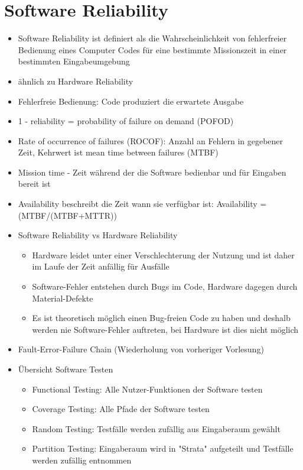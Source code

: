 \documentclass[paper=a4, fontsize=11pt]{scrartcl} %
\numberwithin{equation}{section} %
\numberwithin{figure}{section} %
\numberwithin{table}{section} %
\begin{document}
\section{Software Reliability}

\begin{itemize}
  \item Software Reliability ist definiert als die Wahrscheinlichkeit von fehlerfreier Bedienung eines Computer Codes für eine bestimmte Missionszeit in einer bestimmten Eingabeumgebung
  \item ähnlich zu Hardware Reliability
  \item Fehlerfreie Bedienung: Code produziert die erwartete Ausgabe
  \item 1 - reliability = probability of failure on demand (POFOD)
  \item Rate of occurrence of failures (ROCOF): Anzahl an Fehlern in gegebener Zeit, Kehrwert ist mean time between failures (MTBF)
  \item Mission time - Zeit während der die Software bedienbar und für Eingaben bereit ist
  \item Availability beschreibt die Zeit wann sie verfügbar ist: Availability = (MTBF/(MTBF+MTTR))
  \item Software Reliability vs Hardware Reliability
  \begin{itemize}
    \item Hardware leidet unter einer Verschlechterung der Nutzung und ist daher im Laufe der Zeit anfällig für Ausfälle
    \item Software-Fehler entstehen durch Bugs im Code, Hardware dagegen durch Material-Defekte
    \item Es ist theoretisch möglich einen Bug-freien Code zu haben und deshalb werden nie Software-Fehler auftreten, bei Hardware ist dies nicht möglich
  \end{itemize}
  \item Fault-Error-Failure Chain (Wiederholung von vorheriger Vorlesung)
  \item Übersicht Software Testen
  \begin{itemize}
    \item Functional Testing: Alle Nutzer-Funktionen der Software testen
    \item Coverage Testing: Alle Pfade der Software testen
    \item Random Testing: Testfälle werden zufällig aus Eingaberaum gewählt
    \item Partition Testing: Eingaberaum wird in "Strata" aufgeteilt und Testfälle werden zufällig entnommen

\end{itemize}
\end{itemize}
\end{document}
